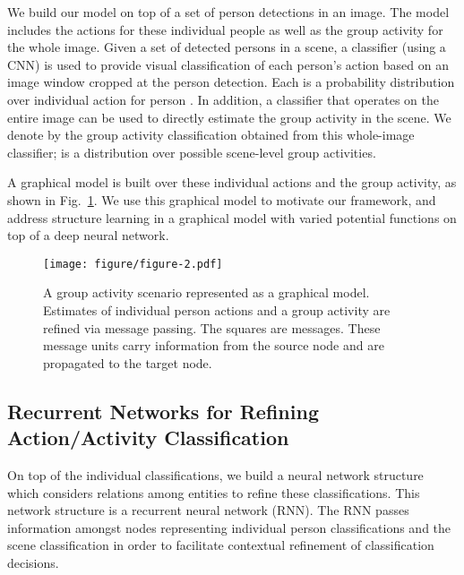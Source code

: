 \documentclass[10pt,twocolumn,letterpaper]{article}
\begin{document}
We build our model on top of a set of person detections in an image.  The model includes the actions for these individual people as well as the group activity for the whole image. Given a set of  detected persons in a scene, a classifier (using a CNN) is used to provide visual classification  of each person's action based on an image window cropped at the person detection. Each  is a probability distribution over individual action for person . In addition, a classifier that operates on the entire image can be used to directly estimate the group activity in the scene.  We denote by  the group activity classification obtained from this whole-image classifier;  is a distribution over possible scene-level group activities.



A graphical model is built over these individual actions and the group activity, as shown in Fig.~\ref{fig:crf}. We use this graphical model to motivate our framework, and address structure learning in a graphical model with varied potential functions on top of a deep neural network.





\begin{figure}
\begin{center}
  \texttt{[image: figure/figure-2.pdf]}
\end{center}
\vspace{-2mm}
\caption{A group activity scenario represented as a graphical model.  Estimates of individual person actions and a group activity are refined via message passing. The squares are messages. These message units carry information from the source node and are propagated to the target node.}
\label{fig:crf}
\vspace{-5mm}
\end{figure}

\subsection{Recurrent Networks for Refining Action/Activity Classification}

On top of the individual classifications, we build a neural network structure which considers relations among entities to refine these classifications. This network structure is a recurrent neural network (RNN).  The RNN passes information amongst nodes representing individual person classifications and the scene classification in order to facilitate contextual refinement of classification decisions.
\end{document}
